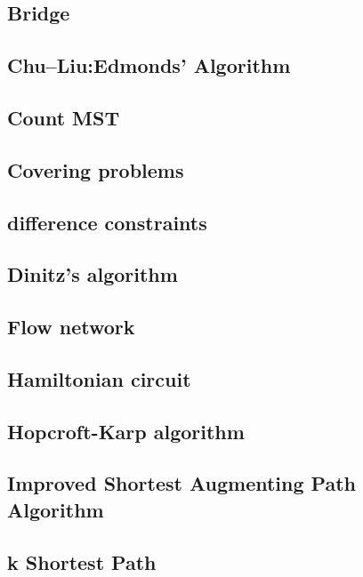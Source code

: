 \documentclass[a4paper,5pt,twocolumn,titlepage]{article}
\begin{document}
\subsection{Bridge}

\subsection{Chu–Liu:Edmonds' Algorithm}

\subsection{Count MST}

\subsection{Covering problems}

\subsection{difference constraints}

\subsection{Dinitz's algorithm}

\subsection{Flow network}

\subsection{Hamiltonian circuit}

\subsection{Hopcroft-Karp algorithm}

\subsection{Improved Shortest Augmenting Path Algorithm}

\subsection{k Shortest Path}

\end{document}
